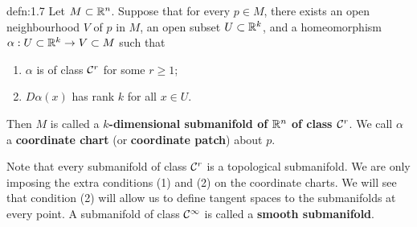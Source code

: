 \begin{defn}{defn:1.7}
    Let $M \subset \mathbb{R}^n$. Suppose that for every $p \in M$, there exists 
    an open neighbourhood $V$ of $p$ in $M$, an open subset $U \subset \mathbb{R}^k$, 
    and a homeomorphism $\alpha : U \subset \mathbb{R}^k \to V \subset M$ such that 
    \begin{enumerate}[(1)]
        \item $\alpha$ is of class ${\cal C}^r$ for some $r \geq 1$; 
        \item $D\alpha(x)$ has rank $k$ for all $x \in U$. 
    \end{enumerate}
    Then $M$ is called a {\bf $k$-dimensional submanifold of $\mathbb{R}^n$ of 
    class ${\cal C}^r$}. We call $\alpha$ a {\bf coordinate chart} (or 
    {\bf coordinate patch}) about $p$.
\end{defn}\vspace{-0.25cm}

Note that every submanifold of class ${\cal C}^r$ is a topological submanifold. 
We are only imposing the extra conditions (1) and (2) on the coordinate charts. 
We will see that condition (2) will allow us to define tangent spaces to 
the submanifolds at every point. A submanifold of class ${\cal C}^\infty$ is 
called a {\bf smooth submanifold}. 

